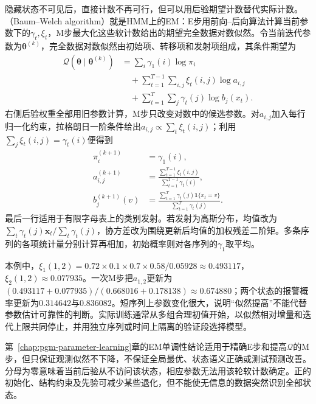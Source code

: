 隐藏状态不可见后，直接计数不再可行，但可以用后验期望计数替代实际计数。（Baum--Welch algorithm）就是HMM上的EM：E步用前向--后向算法计算当前参数下的$\gamma_t,\xi_t$，M步最大化这些软计数给出的期望完全数据对数似然。令当前迭代参数为$\bm{\theta}^{(k)}$，完全数据对数似然由初始项、转移项和发射项组成，其条件期望为
\begin{equation}
  \begin{aligned}
    \mathcal{Q}(\bm{\theta}\mid\bm{\theta}^{(k)})
      &=\sum_i\gamma_1(i)\log\pi_i\\
      &\quad{}+\sum_{t=1}^{T-1}\sum_{i,j}
        \xi_t(i,j)\log a_{i,j}\\
      &\quad{}+\sum_{t=1}^{T}\sum_j
        \gamma_t(j)\log b_j(x_t).
  \end{aligned}
  \label{eq:pgm-dynamic-hmm-em-objective}
\end{equation}
右侧后验权重全部用旧参数计算，M步只改变对数中的候选参数。对$a_{i,j}$加入每行归一化约束，拉格朗日一阶条件给出$a_{i,j}\propto\sum_t\xi_t(i,j)$；利用$\sum_j\xi_t(i,j)=\gamma_t(i)$便得到
\begin{equation}
  \begin{aligned}
    \pi_i^{(k+1)}&=\gamma_1(i),\\
    a_{i,j}^{(k+1)}
      &=\frac{\sum_{t=1}^{T-1}\xi_t(i,j)}
        {\sum_{t=1}^{T-1}\gamma_t(i)},\\
    b_j^{(k+1)}(v)
      &=\frac{\sum_{t=1}^{T}
        \gamma_t(j)\mathbf{1}\{x_t=v\}}
        {\sum_{t=1}^{T}\gamma_t(j)}.
  \end{aligned}
  \label{eq:pgm-dynamic-baum-welch}
\end{equation}
最后一行适用于有限字母表上的类别发射。若发射为高斯分布，均值改为$\sum_t\gamma_t(j)\bm{x}_t/\sum_t\gamma_t(j)$，协方差改为围绕更新后均值的加权残差二阶矩。多条序列的各项统计量分别计算再相加，初始概率则对各序列的$\gamma_1$取平均。

本例中，$\xi_1(1,2)=0.72\times0.1\times0.7\times0.58/0.05928\approx0.493117$，$\xi_2(1,2)\approx0.077935$。一次M步把$a_{1,2}$更新为$(0.493117+0.077935)/(0.668016+0.178138)\approx0.674880$；两个状态的报警概率更新为$0.314642$与$0.836082$。短序列上参数变化很大，说明“似然提高”不能代替参数估计可靠性的判断。实际训练通常从多组合理初值开始，以似然相对增量和迭代上限共同停止，并用独立序列或时间上隔离的验证段选择模型。

第~\ref{chap:pgm-parameter-learning}章的EM单调性结论适用于精确E步和提高$\mathcal Q$的M步，但只保证观测似然不下降，不保证全局最优、状态语义正确或测试预测改善。分母为零意味着当前后验从不访问该状态，相应参数无法用该轮软计数确定。正的初始化、结构约束及先验可减少某些退化，但不能使无信息的数据突然识别全部状态。

